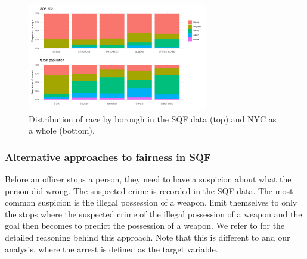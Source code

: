 \begin{figure}
    \centering
    \includegraphics[width=0.7\textwidth]{../figures/sqf_case_study_plot11.png}
    \caption {Distribution of race by borough in the SQF data (top) and NYC as a whole (bottom).}
    \label{fig:borough_race_distribution}
\end{figure}

\subsubsection*{Alternative approaches to fairness in SQF}
Before an officer stops a person, they need to have a suspicion about what the person did wrong. The suspected crime is recorded in the SQF data. The most common suspicion is the illegal possession of a weapon. \cite{kallus2018} limit themselves to only the stops where the suspected crime of the illegal possession of a weapon and the goal then becomes to predict the possession of a weapon. We refer to \cite{goel2016} for the detailed reasoning behind this approach.
Note that this is different to \cite{Badr2022DTFANSP} and our analysis, where the arrest is defined as the target variable.\\

